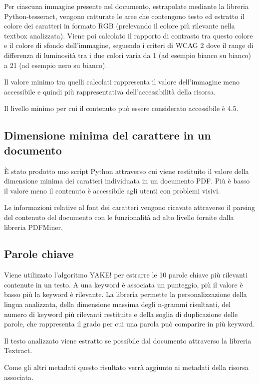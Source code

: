 Per ciascuna immagine presente nel documento, estrapolate mediante la libreria Python-tesseract, vengono catturate le aree che contengono testo ed estratto il colore dei caratteri in formato RGB (prelevando il colore più rilevante nella textbox analizzata). Viene poi calcolato il rapporto di contrasto tra questo colore e il colore di sfondo dell'immagine, seguendo i criteri di WCAG 2 dove il range di differenza di luminosità tra i due colori varia da 1 (ad esempio bianco su bianco) a 21 (ad esempio nero su bianco). 

Il valore minimo tra quelli calcolati rappresenta il valore dell'immagine meno accessibile e quindi più rappresentativa dell'accessibilità della risorsa.

Il livello minimo per cui il contenuto può essere considerato accessibile è 4.5.

\subsection{Dimensione minima del carattere in un documento}
È stato prodotto uno script Python attraverso cui viene restituito il valore della dimensione minima dei caratteri individuata in un documento PDF. Più è basso il valore meno il contenuto è accessibile agli utenti con problemi visivi.

Le informazioni relative al font dei caratteri vengono ricavate attraverso il parsing del contenuto del documento con le funzionalità ad alto livello fornite dalla libreria PDFMiner.

\subsection{Parole chiave}
Viene utilizzato l'algoritmo YAKE! per estrarre le 10 parole chiave più rilevanti contenute in un testo. A una keyword è associata un punteggio, più il valore è basso più la keyword è rilevante. La libreria permette la personalizzazione della lingua analizzata, della dimensione massima degli n-grammi risultanti, del numero di keyword più rilevanti restituite e della soglia di duplicazione delle parole, che rappresenta il grado per cui una parola può comparire in più keyword.

Il testo analizzato viene estratto se possibile dal documento attraverso la libreria Textract.

Come gli altri metadati questo risultato verrà aggiunto ai metadati della risorsa associata.